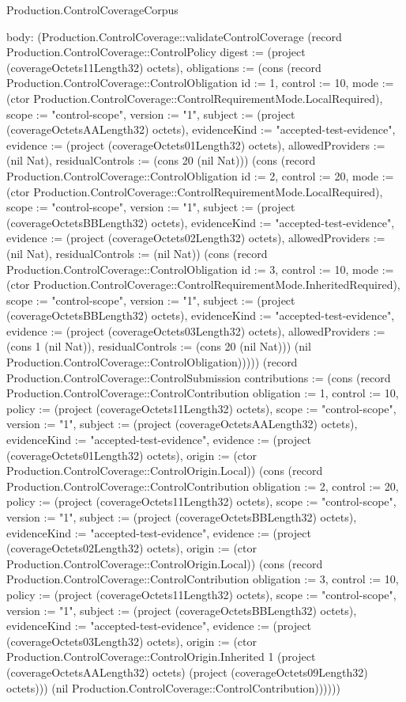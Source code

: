 \begin{lexlean}{Production.ControlCoverageCorpus}
\begin{semanticmodule}
{  body: (Production.ControlCoverage::validateControlCoverage (record Production.ControlCoverage::ControlPolicy {digest := (project (coverageOctets11Length32) octets), obligations := (cons (record Production.ControlCoverage::ControlObligation {id := 1, control := 10, mode := (ctor Production.ControlCoverage::ControlRequirementMode.LocalRequired), scope := "control-scope", version := "1", subject := (project (coverageOctetsAALength32) octets), evidenceKind := "accepted-test-evidence", evidence := (project (coverageOctets01Length32) octets), allowedProviders := (nil Nat), residualControls := (cons 20 (nil Nat))}) (cons (record Production.ControlCoverage::ControlObligation {id := 2, control := 20, mode := (ctor Production.ControlCoverage::ControlRequirementMode.LocalRequired), scope := "control-scope", version := "1", subject := (project (coverageOctetsBBLength32) octets), evidenceKind := "accepted-test-evidence", evidence := (project (coverageOctets02Length32) octets), allowedProviders := (nil Nat), residualControls := (nil Nat)}) (cons (record Production.ControlCoverage::ControlObligation {id := 3, control := 10, mode := (ctor Production.ControlCoverage::ControlRequirementMode.InheritedRequired), scope := "control-scope", version := "1", subject := (project (coverageOctetsBBLength32) octets), evidenceKind := "accepted-test-evidence", evidence := (project (coverageOctets03Length32) octets), allowedProviders := (cons 1 (nil Nat)), residualControls := (cons 20 (nil Nat))}) (nil Production.ControlCoverage::ControlObligation))))}) (record Production.ControlCoverage::ControlSubmission {contributions := (cons (record Production.ControlCoverage::ControlContribution {obligation := 1, control := 10, policy := (project (coverageOctets11Length32) octets), scope := "control-scope", version := "1", subject := (project (coverageOctetsAALength32) octets), evidenceKind := "accepted-test-evidence", evidence := (project (coverageOctets01Length32) octets), origin := (ctor Production.ControlCoverage::ControlOrigin.Local)}) (cons (record Production.ControlCoverage::ControlContribution {obligation := 2, control := 20, policy := (project (coverageOctets11Length32) octets), scope := "control-scope", version := "1", subject := (project (coverageOctetsBBLength32) octets), evidenceKind := "accepted-test-evidence", evidence := (project (coverageOctets02Length32) octets), origin := (ctor Production.ControlCoverage::ControlOrigin.Local)}) (cons (record Production.ControlCoverage::ControlContribution {obligation := 3, control := 10, policy := (project (coverageOctets11Length32) octets), scope := "control-scope", version := "1", subject := (project (coverageOctetsBBLength32) octets), evidenceKind := "accepted-test-evidence", evidence := (project (coverageOctets03Length32) octets), origin := (ctor Production.ControlCoverage::ControlOrigin.Inherited 1 (project (coverageOctetsAALength32) octets) (project (coverageOctets09Length32) octets))}) (nil Production.ControlCoverage::ControlContribution))))}))
}


\end{semanticmodule}
\end{lexlean}
